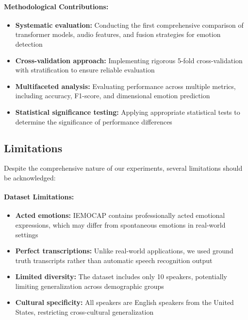 \documentclass[12pt]{article}
\begin{document}
\paragraph{Methodological Contributions:}
\begin{itemize}
    \item \textbf{Systematic evaluation:} Conducting the first comprehensive comparison of transformer models, audio features, and fusion strategies for emotion detection
    
    \item \textbf{Cross-validation approach:} Implementing rigorous 5-fold cross-validation with stratification to ensure reliable evaluation
    
    \item \textbf{Multifaceted analysis:} Evaluating performance across multiple metrics, including accuracy, F1-score, and dimensional emotion prediction
    
    \item \textbf{Statistical significance testing:} Applying appropriate statistical tests to determine the significance of performance differences
\end{itemize}

\subsection{Limitations}
Despite the comprehensive nature of our experiments, several limitations should be acknowledged:

\paragraph{Dataset Limitations:}
\begin{itemize}
    \item \textbf{Acted emotions:} IEMOCAP contains professionally acted emotional expressions, which may differ from spontaneous emotions in real-world settings
    
    \item \textbf{Perfect transcriptions:} Unlike real-world applications, we used ground truth transcripts rather than automatic speech recognition output
    
    \item \textbf{Limited diversity:} The dataset includes only 10 speakers, potentially limiting generalization across demographic groups
    
    \item \textbf{Cultural specificity:} All speakers are English speakers from the United States, restricting cross-cultural generalization
\end{itemize}
\end{document}
